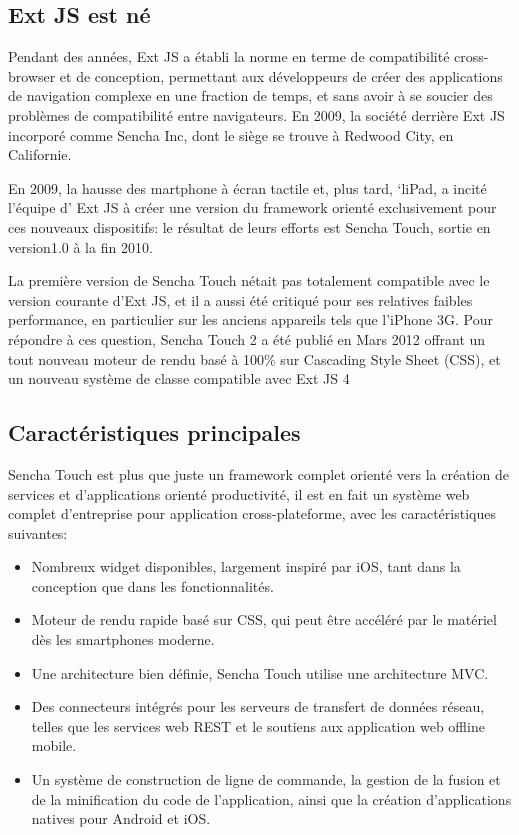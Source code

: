 \subsection{Ext JS est né}

Pendant des années, Ext JS a établi la norme en terme de compatibilité cross-browser et de conception, permettant aux développeurs de créer des applications de navigation complexe en une fraction de temps, et sans avoir à se soucier des problèmes de compatibilité entre navigateurs. En 2009, la société derrière Ext JS incorporé comme Sencha Inc, dont le siège se trouve à Redwood City, en Californie.

En 2009, la hausse des martphone à écran tactile et, plus tard, ‘liPad, a incité l’équipe d’ Ext JS à créer une version du framework orienté exclusivement pour ces nouveaux dispositifs: le résultat de leurs efforts est Sencha Touch, sortie en version1.0 à la fin 2010.

La première version de Sencha Touch nétait pas totalement compatible avec le version courante d’Ext JS, et il a aussi été critiqué pour ses relatives faibles performance, en particulier sur les anciens appareils tels que l’iPhone 3G. Pour répondre à ces question, Sencha Touch 2 a été publié en Mars 2012 offrant un tout nouveau moteur de rendu basé à 100\% sur Cascading Style Sheet (CSS), et un nouveau système de classe compatible avec Ext JS 4

\subsection{Caractéristiques principales}



Sencha Touch est plus que juste un framework complet orienté vers la création de services et d’applications orienté productivité,  il est en fait un système web complet d’entreprise pour application cross-plateforme, avec 
les caractéristiques suivantes:

\begin{itemize}

  \item[\textbullet]
  Nombreux widget disponibles, largement inspiré par iOS, tant dans la conception que dans les fonctionnalités.

  \item[\textbullet]
  Moteur de rendu rapide basé sur CSS, qui peut être accéléré par le matériel dès les smartphones moderne.

  \item[\textbullet]
  Une architecture bien définie,  Sencha Touch utilise une architecture MVC.

  \item[\textbullet]
  Des connecteurs intégrés pour les serveurs de transfert de données réseau, telles que les services web REST et le soutiens aux application web offline mobile.

  \item[\textbullet]
  Un système de construction de ligne de commande, la gestion de la fusion et de la minification du code de l’application, ainsi que la création d’applications natives pour Android et iOS.

\end{itemize}

